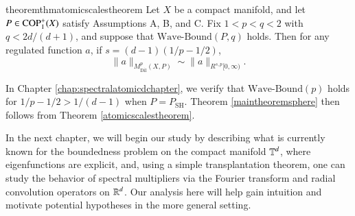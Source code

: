 \begin{restatable}{theorem}{thmatomicscalestheorem} \label{atomicscalestheorem}
  Let $X$ be a compact manifold, and let $P \in {\text{COP}^{+}_{{1}}}(X)$ satisfy Assumptions A, B, and C. Fix $1 < p < q < 2$ with $q < 2d/(d+1)$, and suppose that $\text{Wave-Bound}(P,q)$ holds. Then for any regulated function $a$, if $s = (d-1)(1/p - 1/2)$,
  \[ \| a \|_{M^p_{\text{Dil}}(X,P)} \sim \| a \|_{R^{s,p}[0,\infty)}. \]
\end{restatable}

In Chapter \ref{chap:spectralatomicdchapter}, we verify that $\text{Wave-Bound}(p)$ holds for $1/p - 1/2 > 1/(d-1)$ when $P = P_{\text{SH}}$. Theorem \ref{maintheoremsphere} then follows from Theorem \ref{atomicscalestheorem}.%



In the next chapter, we will begin our study by describing what is currently known for the boundedness problem on the compact manifold $\operatorname{\mathbb{T}}^d$, where eigenfunctions are explicit, and, using a simple transplantation theorem, one can study the behavior of spectral multipliers via the Fourier transform and radial convolution operators on $\operatorname{\mathbb{R}}^d$. Our analysis here will help gain intuition and motivate potential hypotheses in the more general setting.


